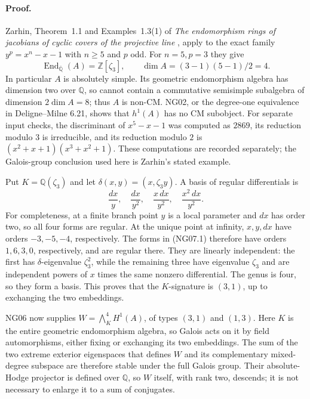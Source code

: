 \paragraph{Proof.}
Zarhin, Theorem~1.1 and Examples~1.3(1) of
\emph{The endomorphism rings of jacobians of cyclic covers of the
projective line} \cite{NGZarhin}, apply to the exact family
$y^p=x^n-x-1$ with $n\ge5$ and $p$ odd.  For $n=5,p=3$ they give
\[
 \operatorname{End}_{\overline{\mathbb Q}}(A)=\mathbb Z[\zeta_3],
 \qquad \dim A=(3-1)(5-1)/2=4.
\]
In particular $A$ is absolutely simple.  Its geometric endomorphism
algebra has dimension two over $\mathbb Q$, so cannot contain a
commutative semisimple subalgebra of dimension $2\dim A=8$; thus
$A$ is non-CM.  NG02, or the degree-one equivalence in
Deligne--Milne 6.21, shows that $h^1(A)$ has no CM subobject.
For separate input checks, the discriminant of $x^5-x-1$ was computed as
$2869$, its reduction modulo $3$ is irreducible, and its reduction
modulo $2$ is
$(x^2+x+1)(x^3+x^2+1)$.  These computations are recorded separately;
the Galois-group conclusion used here is Zarhin's stated example.

Put $K=\mathbb Q(\zeta_3)$ and let
$\delta(x,y)=(x,\zeta_3y)$.  A basis of regular differentials is
\[
 \frac{dx}{y},\quad \frac{dx}{y^2},\quad
                    \frac{x\,dx}{y^2},\quad
                    \frac{x^2\,dx}{y^2}.                    \tag{NG07.1}
\]
For completeness, at a finite branch point $y$ is a local parameter
and $dx$ has order two, so all four forms are regular.  At the unique
point at infinity, $x,y,dx$ have orders $-3,-5,-4$, respectively.
The forms in (NG07.1) therefore have orders $1,6,3,0$, respectively,
and are regular there.  They are linearly independent: the first has
$\delta$-eigenvalue $\zeta_3^2$, while the remaining three have
eigenvalue $\zeta_3$ and are independent powers of $x$ times the same
nonzero differential.  The genus is four, so they form a basis.
This proves that the $K$-signature is $(3,1)$, up to exchanging the
two embeddings.

NG06 now supplies
$W=\bigwedge_K^4 H^1(A)$, of types $(3,1)$ and $(1,3)$.
Here $K$ is the entire geometric endomorphism algebra, so Galois acts
on it by field automorphisms, either fixing or exchanging its two
embeddings.  The sum of the two extreme exterior eigenspaces that
defines $W$ and its complementary mixed-degree subspace are
therefore stable under the full Galois group.  Their absolute-Hodge
projector is defined over $\mathbb Q$, so $W$ itself, with rank two,
descends; it is not necessary to enlarge it to a sum of conjugates.

